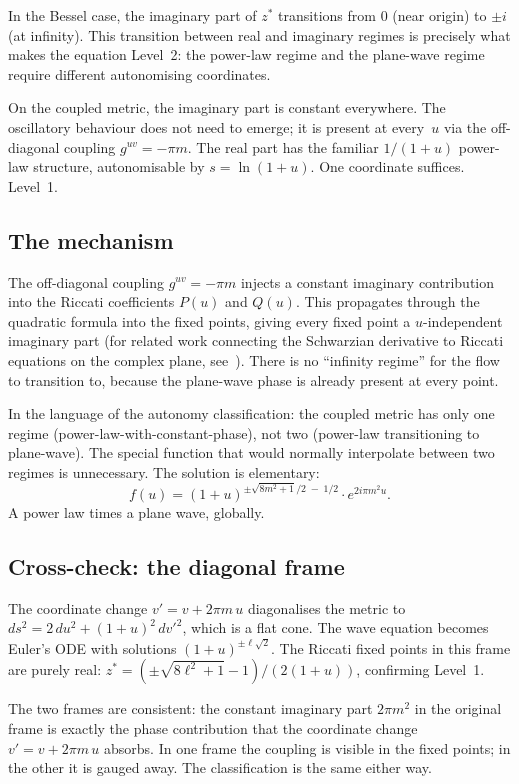 \documentclass{amsart}
\theoremstyle{definition}
\theoremstyle{remark}
\begin{document}
In the Bessel case, the imaginary part of $z^*$ transitions from $0$ (near origin) to $\pm i$ (at infinity). This transition between real and imaginary regimes is precisely what makes the equation Level~2: the power-law regime and the plane-wave regime require different autonomising coordinates.

On the coupled metric, the imaginary part is constant everywhere. The oscillatory behaviour does not need to emerge; it is present at every~$u$ via the off-diagonal coupling $g^{uv} = -\pi m$. The real part has the familiar $1/(1{+}u)$ power-law structure, autonomisable by $s = \ln(1{+}u)$. One coordinate suffices. Level~1.

\subsection{The mechanism}

The off-diagonal coupling $g^{uv} = -\pi m$ injects a constant imaginary contribution into the Riccati coefficients $P(u)$ and $Q(u)$. This propagates through the quadratic formula into the fixed points, giving every fixed point a $u$-independent imaginary part (for related work connecting the Schwarzian derivative to Riccati equations on the complex plane, see~\cite{Carillo2024, Osgood1998}). There is no ``infinity regime'' for the flow to transition to, because the plane-wave phase is already present at every point.

In the language of the autonomy classification: the coupled metric has only one regime (power-law-with-constant-phase), not two (power-law transitioning to plane-wave). The special function that would normally interpolate between two regimes is unnecessary. The solution is elementary:
\[
f(u) = (1+u)^{\pm\sqrt{8m^2+1}/2 \;-\; 1/2} \cdot e^{2i\pi m^2 u}.
\]
A power law times a plane wave, globally.

\subsection{Cross-check: the diagonal frame}

The coordinate change $v' = v + 2\pi m\,u$ diagonalises the metric to $ds^2 = 2\,du^2 + (1{+}u)^2\,dv'^2$, which is a flat cone. The wave equation becomes Euler's ODE with solutions $(1{+}u)^{\pm\ell\sqrt{2}}$. The Riccati fixed points in this frame are purely real: $z^* = (\pm\sqrt{8\ell^2 + 1} - 1)/(2(1{+}u))$, confirming Level~1.

The two frames are consistent: the constant imaginary part $2\pi m^2$ in the original frame is exactly the phase contribution that the coordinate change $v' = v + 2\pi m\,u$ absorbs. In one frame the coupling is visible in the fixed points; in the other it is gauged away. The classification is the same either way.
\end{document}
